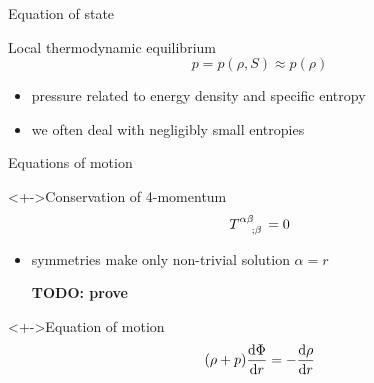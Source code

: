 \documentclass{beamer}
\let\svthefootnote\thefootnote
\newcommand\blankfootnote[1]{%
  \let\thefootnote\relax\footnotetext{#1}%
  \let\thefootnote\svthefootnote%
}
\begin{document}
\begin{frame}{Equation of state}

\begin{block}{Local thermodynamic equilibrium}
\begin{displaymath}
  p = p(\rho, S) \approx p(\rho)
\end{displaymath}
\end{block}

\begin{itemize}
\item pressure related to energy density and specific entropy
\item we often deal with negligibly small entropies
\end{itemize}

\blankfootnote{\textcite[p. 261]{Schutz}}



\end{frame}


\begin{frame}{Equations of motion}

\begin{block}<+->{Conservation of 4-momentum}
\begin{displaymath}
  \tensor{T}{^{\alpha\beta}_{;\beta}} = 0
\end{displaymath}
\end{block}

\begin{itemize}
\item<+-> symmetries make only non-trivial solution $\alpha = r$

\textbf{TODO: prove}
\end{itemize}

\begin{block}<+->{Equation of motion}
\begin{displaymath}
  (\rho + p) \dv{\Phi}{r} = -\dv{\rho}{r}
\end{displaymath}
\end{block}

\blankfootnote{\textcite[pp. 175, 261]{Schutz}}



\end{frame}
\end{document}
